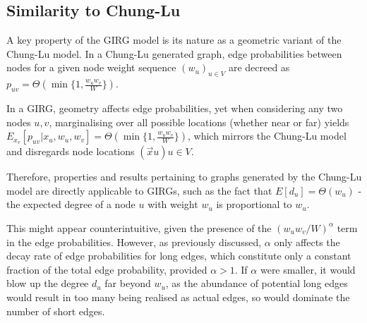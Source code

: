
\subsection{Similarity to Chung-Lu}
A key property of the GIRG model is its nature as a geometric variant of the Chung-Lu model. In a Chung-Lu generated graph, edge probabilities between nodes for a given node weight sequence $(w_u)_{u \in V}$ are decreed as $p_{uv} = \Theta(\min\{1, \frac{w_u w_v}{W}\})$.


In a GIRG, geometry affects edge probabilities, yet when considering any two nodes $u,v$, marginalising over all possible locations (whether near or far) yields $E_{x_v}[p_{uv} | x_u, w_u, w_v] = \Theta(\min\{1, \frac{w_u w_v}{W} \})$, which mirrors the Chung-Lu model and disregards node locations $(\vec{x}u){u \in V}$.

Therefore, properties and results pertaining to graphs generated by the Chung-Lu model are directly applicable to GIRGs, such as the fact that $E[d_u] = \Theta(w_u)$ - the expected degree of a node $u$ with weight $w_u$ is proportional to $w_u$.

This might appear counterintuitive, given the presence of the $(w_u w_v / W)^\alpha$ term in the edge probabilities. However, as previously discussed, $\alpha$ only affects the decay rate of edge probabilities for long edges, which constitute only a constant fraction of the total edge probability, provided $\alpha > 1$. If $\alpha$ were smaller, it would blow up the degree $d_u$ far beyond $w_u$, as the abundance of potential long edges would result in too many being realised as actual edges, so would dominate the number of short edges.






